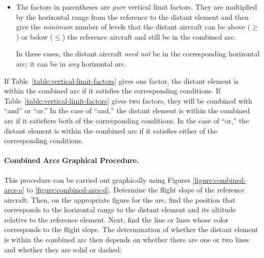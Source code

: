 {\begin{itemize}
In these cases, the distant aircraft must also be in the corresponding horizontal arc to be within the combined arc.

\item
The factors in parentheses are \emph{pure} vertical limit factors. They are multiplied by the horizontal range from the reference to the distant element and then give the \emph{minimum} number of levels that the distant aircraft can be above ($\ge$) or below ($\le$) the reference aircraft and still be in the combined arc. 

In these cases, the distant aircraft \emph{need not} be in the corresponding horizontal arc; it can be in \emph{any} horizontal arc.

\end{itemize}

If Table~\ref{table:vertical-limit-factors} gives one factor, the distant element is within the combined arc if it satisfies the corresponding conditions. If Table~\ref{table:vertical-limit-factors} gives two factors, they will be combined with “and” or “or.” In the case of “and,” the distant element is within the combined arc if it satisfiers both of the corresponding conditions. In the case of “or,” the distant element is within the combined arc if it satisfies either of the corresponding conditions.


\paragraph{Combined Arcs Graphical Procedure.}

This procedure can be carried out graphically using Figures \ref{figure:combined-arcs-a} to \ref{figure:combined-arcs-d}. Determine the flight slope of the reference aircraft. Then, on the appropriate figure for the arc, find the position that corresponds to the horizontal range to the distant element and its altitude relative to the reference element. Next, find the line or lines whose color corresponds to the flight slope. The determination of whether the distant element is within the combined arc then depends on whether there are one or two lines and whether they are solid or dashed:

}
